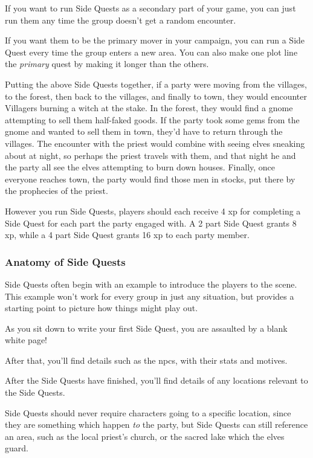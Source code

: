 \begin{multicols}{2}
If you want to run Side Quests as a secondary part of your game, you can just run them any time the group doesn't get a random encounter.

If you want them to be the primary mover in your campaign, you can run a Side Quest every time the group enters a new area.
You can also make one plot line the \emph{primary} quest by making it longer than the others.

Putting the above Side Quests together, if a party were moving from the villages, to the forest, then back to the villages, and finally to town, they would 
encounter Villagers burning a witch at the stake.
In the forest, they would find a gnome attempting to sell them half-faked goods.
If the party took some gems from the gnome and wanted to sell them in town, they'd have to return through the villages.
The encounter with the priest would combine with seeing elves sneaking about at night, so perhaps the priest travels with them, and that night he and the party all see the elves attempting to burn down houses.
Finally, once everyone reaches town, the party would find those men in stocks, put there by the prophecies of the priest.

However you run Side Quests, players should each receive 4 \gls{xp} for completing a Side Quest for each part the party engaged with.
A 2 part Side Quest grants 8 \gls{xp}, while a 4 part Side Quest grants 16 \gls{xp} to each party member.

\subsubsection{Anatomy of Side Quests}

Side Quests often begin with an example to introduce the players to the scene.
This example won't work for every group in just any situation, but provides a starting point to picture how things might play out.

\begin{boxtext}

	As you sit down to write your first Side Quest, you are assaulted by a blank white page!

\end{boxtext}

After that, you'll find details such as the \glspl{npc}, with their stats and motives.

After the Side Quests have finished, you'll find details of any locations relevant to the Side Quests.

Side Quests should never require characters going to a specific location, since they are something which happen \emph{to} the party, but Side Quests can still reference an area, such as the local priest's church, or the sacred lake which the elves guard.


\end{multicols}
